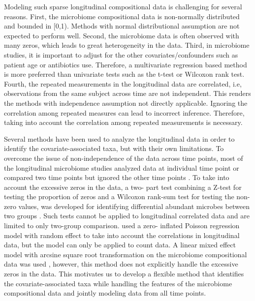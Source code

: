 Modeling such sparse longitudinal compositional data is challenging for several reasons. First, the microbiome compositional data is non-normally distributed and bounded in [0,1). Methods with normal distributional assumption are not expected to perform well. Second, the microbiome data is often observed with many zeros, which leads to great heterogeneity in the data. Third, in microbiome studies, it is important to adjust for the other covariates/confounders such as patient age or antibiotics use. Therefore, a multivariate regression based method is more preferred than univariate tests such as the t-test or Wilcoxon rank test. Fourth, the repeated measurements in the longitudinal data are correlated, i.e, observations from the same subject across time are not independent. This renders the methods with independence assumption not directly applicable. Ignoring the correlation among repeated measures can lead to incorrect inference. Therefore, taking into account the correlation among repeated measurements is necessary. 


Several methods have been used to analyze the longitudinal data in order to identify the covariate-associated taxa, but with their own limitations. To overcome the issue of non-independence of the data across time points, most of the longitudinal microbiome studies analyzed data at individual time point \citep{Cox:2014hy, arrieta2015early, Rutten:2015bx, Zhou:2015kw, David:2014cl, Schulz:2014fy} or compared two time points but ignored the other time points \citep{Backhed:2015kc, Koren:2012ji}. To take into account the excessive zeros in the data, a two- part test combining a Z-test for testing the proportion of zeros and a Wilcoxon rank-sum test for testing the non-zero values, was developed for identifying differential abundant microbes between two groups \citep{wagner2011application, markle2013sex}. Such tests cannot be applied to longitudinal correlated data and are limited to only two-group comparison. \citet{Romero:2014il} used a zero- inflated Poisson regression model with random effect to take into account the correlations in longitudinal data, but the model can only be applied to count data. A linear mixed effect model with arcsine square root transformation on the microbiome compositional data was used \citep{LaRosa:2014kk, Kostic:2015bh}, however, this method does not explicitly handle the excessive zeros in the data. This motivates us to develop a flexible method that identifies the covariate-associated taxa while handling the features of the microbiome compositional data and jointly modeling data from all time points. 


